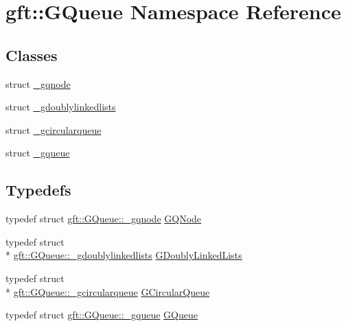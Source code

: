 \hypertarget{namespacegft_1_1GQueue}{\section{gft\-:\-:G\-Queue Namespace Reference}
\label{namespacegft_1_1GQueue}
}
\subsection*{Classes}
\begin{DoxyCompactItemize}
\item 
struct \hyperlink{structgft_1_1GQueue_1_1__gqnode}{\-\_\-gqnode}
\item 
struct \hyperlink{structgft_1_1GQueue_1_1__gdoublylinkedlists}{\-\_\-gdoublylinkedlists}
\item 
struct \hyperlink{structgft_1_1GQueue_1_1__gcircularqueue}{\-\_\-gcircularqueue}
\item 
struct \hyperlink{structgft_1_1GQueue_1_1__gqueue}{\-\_\-gqueue}
\end{DoxyCompactItemize}
\subsection*{Typedefs}
\begin{DoxyCompactItemize}
\item 
typedef struct \hyperlink{structgft_1_1GQueue_1_1__gqnode}{gft\-::\-G\-Queue\-::\-\_\-gqnode} \hyperlink{namespacegft_1_1GQueue_ac7674cc67b8bc9f99e7be02c493f473e}{G\-Q\-Node}
\item 
typedef struct \\*
\hyperlink{structgft_1_1GQueue_1_1__gdoublylinkedlists}{gft\-::\-G\-Queue\-::\-\_\-gdoublylinkedlists} \hyperlink{namespacegft_1_1GQueue_a0e26f1e55446a32e3d979146492805e3}{G\-Doubly\-Linked\-Lists}
\item 
typedef struct \\*
\hyperlink{structgft_1_1GQueue_1_1__gcircularqueue}{gft\-::\-G\-Queue\-::\-\_\-gcircularqueue} \hyperlink{namespacegft_1_1GQueue_a4e50e86d194a07f26216a096b1f5a067}{G\-Circular\-Queue}
\item 
typedef struct \hyperlink{structgft_1_1GQueue_1_1__gqueue}{gft\-::\-G\-Queue\-::\-\_\-gqueue} \hyperlink{namespacegft_1_1GQueue_a3ed1b095d0e60d83f93c6e9a64a6058d}{G\-Queue}
\end{DoxyCompactItemize}
